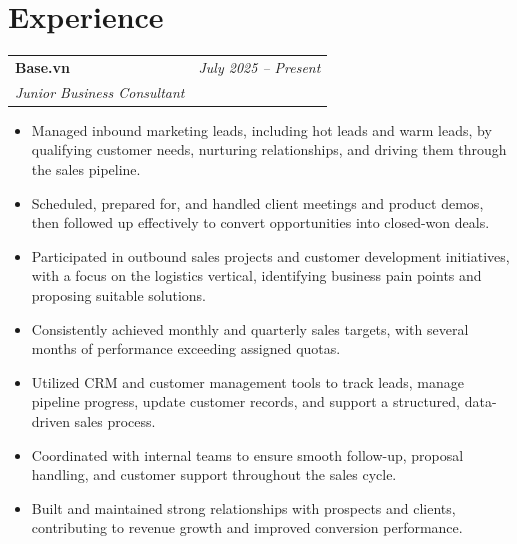 \documentclass[a4paper,11pt]{article}
\makeatletter
\newcommand{\resumeSubheading}[4]{
\vspace{0.5mm}\item
    \begin{tabular*}{0.98\textwidth}[t]{l@{\extracolsep{\fill}}r}
        \textbf{#1} & \textit{\footnotesize{#4}} \\
        \textit{\footnotesize{#3}} &  \footnotesize{#2}\\
    \end{tabular*}
    \vspace{-2.4mm}
}
\newcommand{\resumeItemListStart}{\begin{justify}\begin{itemize}[leftmargin=3ex, rightmargin=2ex, noitemsep,labelsep=1.2mm,itemsep=0mm]\small}
\newcommand{\resumeItemListEnd}{\end{itemize}\end{justify}\vspace{-2mm}}
\makeatother
\begin{document}
\section{\textbf{Experience}}
\resumeSubheading
  {Base.vn}{}
  {Junior Business Consultant}{July 2025 -- Present}
    \resumeItemListStart
        \item {Managed inbound marketing leads, including hot leads and warm leads, by qualifying customer needs, nurturing relationships, and driving them through the sales pipeline.}
    
        \item {Scheduled, prepared for, and handled client meetings and product demos, then followed up effectively to convert opportunities into closed-won deals.}
    
        \item {Participated in outbound sales projects and customer development initiatives, with a focus on the logistics vertical, identifying business pain points and proposing suitable solutions.}
    
        \item {Consistently achieved monthly and quarterly sales targets, with several months of performance exceeding assigned quotas.}
    
        \item {Utilized CRM and customer management tools to track leads, manage pipeline progress, update customer records, and support a structured, data-driven sales process.}
    
        \item {Coordinated with internal teams to ensure smooth follow-up, proposal handling, and customer support throughout the sales cycle.}
    
        \item {Built and maintained strong relationships with prospects and clients, contributing to revenue growth and improved conversion performance.}
    \resumeItemListEnd
\end{document}
